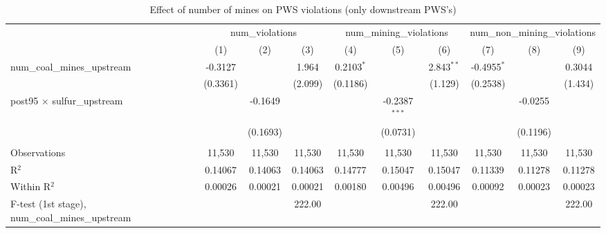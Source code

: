 
\begin{table}[htbp]
   \caption{\label{olsrf2sls_nummine_count_vio_1985to2005dwnstrm} Effect of number of mines on PWS violations (only downstream PWS's)}
   \bigskip
   \centering
   \begin{adjustbox}{width = \textwidth, center}
      \begin{tabular}{lccccccccc}
         \toprule
          & \multicolumn{3}{c}{num\_violations} & \multicolumn{3}{c}{num\_mining\_violations} & \multicolumn{3}{c}{num\_non\_mining\_violations}\\
                                                           & (1)           & (2)           & (3)           & (4)           & (5)             & (6)           & (7)           & (8)           & (9)\\  
         \midrule 
         num\_coal\_mines\_upstream                        & -0.3127       &               & 1.964         & 0.2103$^{*}$  &                 & 2.843$^{**}$  & -0.4955$^{*}$ &               & 0.3044\\   
                                                           & (0.3361)      &               & (2.099)       & (0.1186)      &                 & (1.129)       & (0.2538)      &               & (1.434)\\   
         post95 $\times$ sulfur\_upstream                  &               & -0.1649       &               &               & -0.2387$^{***}$ &               &               & -0.0255       &   \\   
                                                           &               & (0.1693)      &               &               & (0.0731)        &               &               & (0.1196)      &   \\   
          \\
         Observations                                      & 11,530        & 11,530        & 11,530        & 11,530        & 11,530          & 11,530        & 11,530        & 11,530        & 11,530\\  
         R$^2$                                             & 0.14067       & 0.14063       & 0.14063       & 0.14777       & 0.15047         & 0.15047       & 0.11339       & 0.11278       & 0.11278\\  
         Within R$^2$                                      & 0.00026       & 0.00021       & 0.00021       & 0.00180       & 0.00496         & 0.00496       & 0.00092       & 0.00023       & 0.00023\\  
         F-test (1st stage), num\_coal\_mines\_upstream    &               &               & 222.00        &               &                 & 222.00        &               &               & 222.00\\  

\end{tabular}
\end{adjustbox}
\end{table}
